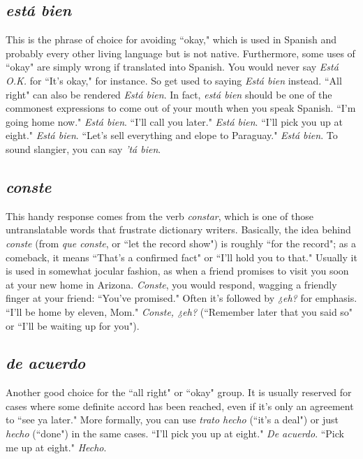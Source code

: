 \subsection{\emph{está bien}}

This is the phrase of choice for avoiding ``okay," which is used
in Spanish and probably every other living language but is not native.
Furthermore, some uses of ``okay" are simply wrong if translated into
Spanish. You would never say \emph{Está O.K.} for ``It's okay," for instance. So
get used to saying \emph{Está bien} instead. ``All right" can also be rendered
\emph{Está bien}. In fact, \emph{está bien} should be one of the commonest expressions to come out of your mouth when you speak Spanish. ``I'm going
home now." \emph{Está bien}. ``I'll call you later." \emph{Está bien}. ``I'll pick you up
at eight." \emph{Está bien}. ``Let's sell everything and elope to Paraguay." \emph{Está
bien}. To sound slangier, you can say \emph{'tá bien}.

\subsection{\emph{conste}}

This handy response comes from the verb \emph{constar}, which is
one of those untranslatable words that frustrate dictionary writers.
Basically, the idea behind \emph{conste} (from \emph{que conste}, or ``let the record
show") is roughly ``for the record"; as a comeback, it means ``That's a
confirmed fact" or ``I'll hold you to that." Usually it is used in somewhat jocular fashion, as when a friend promises to visit you soon at
your new home in Arizona. \emph{Conste}, you would respond, wagging a
friendly finger at your friend: ``You've promised." Often it's followed
by \emph{¿eh?} for emphasis. ``I'll be home by eleven, Mom." \emph{Conste, ¿eh?}
(``Remember later that you said so" or ``I'll be waiting up for you").

\subsection{\emph{de acuerdo}}

Another good choice for the ``all right" or ``okay" group. It
is usually reserved for cases where some definite accord has been
reached, even if it's only an agreement to ``see ya later." More formally,
you can use \emph{trato hecho} (``it's a deal") or just \emph{hecho} (``done") in the
same cases. ``I'll pick you up at eight." \emph{De acuerdo}. ``Pick me up at
eight." \emph{Hecho}.

